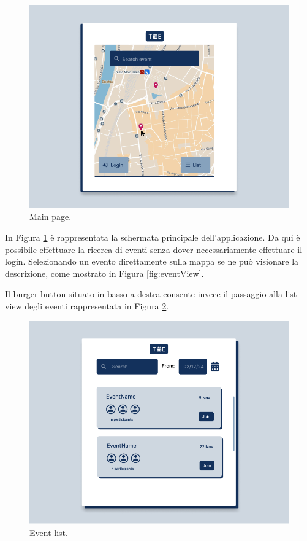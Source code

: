 \documentclass[9pt]{extarticle}
\begin{document}
\begin{figure}[!htb]
	\centering
	\includegraphics[width=.7\linewidth]{./images/MainPage.pdf}
	\caption{Main page.}
	\label{fig:mainPage}
\end{figure}

In Figura \ref{fig:mainPage} è rappresentata la schermata principale dell'applicazione. Da qui è possibile effettuare la ricerca di eventi senza dover necessariamente effettuare il login. Selezionando un evento direttamente sulla mappa se ne può visionare la descrizione, come mostrato in Figura \ref{fig:eventView}.

Il burger button situato in basso a destra consente invece il passaggio alla list view degli eventi rappresentata in Figura \ref{fig:eventListSearch}.

\begin{figure}[!htb]
	\centering
	\includegraphics[width=.7\linewidth]{./images/EventListSearch.pdf}
	\caption{Event list.}
	\label{fig:eventListSearch}
\end{figure}
\end{document}
